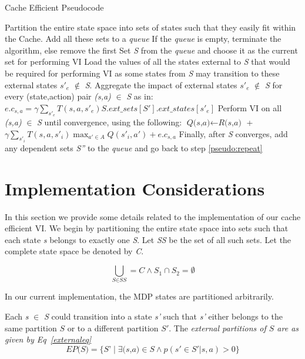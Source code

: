 \documentclass[conference]{IEEEtran}
\begin{document}
\begin{algorithm}
\caption{Cache Efficient Pseudocode}
\label{alg:CaV:Pseudo}
\begin{algorithmic}[1]
\State Partition the entire state space into sets of states such that they easily fit within the Cache.
\State Add all these sets to a \textit{queue}
\State If the \textit{queue} is empty, terminate the algorithm, else remove the first Set \textit{S} from the \textit{queue} and choose it as the current set for performing VI
\label{pseudo:repeat}
\State Load the values of all the states external to \textit{S} that would be required for performing VI as some states from \textit{S} may transition to these external states \textit{$s'_{e}$} $\notin$ \textit{S}.
\label{pseudo:loadext}
\State Aggregate the impact of external states \textit{$s'_{e}$} $\notin$ \textit{S} for every (state,action) pair \textit{(s,a)} $\in$ \textit{S} as in:
$e.c_{s,a} = \gamma \sum\limits_{s'_{e}} T(s,a,s'_{e}) S.ext\_sets[S'].ext\_states[s'_{e}]$
\label{pseudo:aggext}
\State Perform VI on all \textit{(s,a)} $\in$ \textit{S} until convergence, using the following:
$\textit{Q(s,a)} \leftarrow \textit{R(s,a)}$ + \\
			$\gamma \sum\limits_{s'_{i}} T(s,a,s'_{i})  {\displaystyle\max_{a'\in A} } Q(s'_{i},a') + e.c_{s,a}$
\label{pseudo:VIonS}
\State Finally, after \textit{S} converges, add any dependent sets \textit{S''} to the \textit{queue} and go back to step \ref{pseudo:repeat}
\end{algorithmic}
\end{algorithm}

\section{Implementation Considerations}
\label{sec:imp}
In this section we provide some details related to the implementation of our cache efficient VI.
We begin by partitioning the entire state space into sets such that each state \textit{s} belongs to exactly one \textit{S}. Let \textit{SS} be the set of all such sets. Let the complete state space be denoted by \textit{C}.

\begin{equation}
 \bigcup_{\textit{S} \in \textit{SS} } = C \land \textit{$S_1$} \cap \textit{$S_2$} = \emptyset
\end{equation}

In our current implementation, the MDP states are partitioned arbitrarily.

Each \textit{s} $\in$ \textit{S} could transition into a state \textit{s'} such that \textit{s'} either belongs to the same partition $S$ or to a different partition $S'$.
The \em{external partitions} of $S$ are as given by Eq~\ref{externaleq}
\begin{equation}
\textit{EP(S)} = \{\textit{S'} \mid \exists \textit{(s,a)} \in \textit{S} \land p(s' \in S'|s,a) > 0\} \label{externaleq}
\end{equation}
\end{document}
